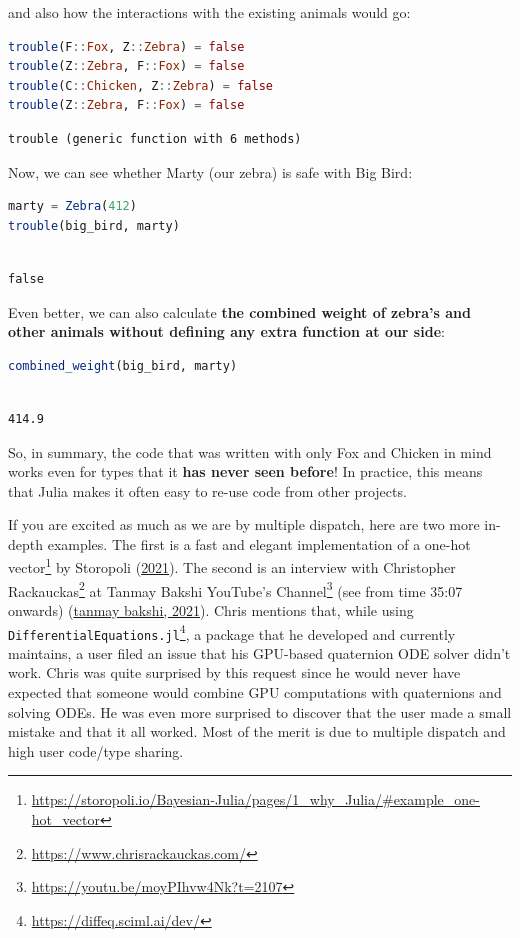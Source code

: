 \documentclass[
  notoc %
]{tufte-book}
\DeclareRobustCommand{\href}[2]{#2\footnote{\url{#1}}}
\newcommand{\passthrough}[1]{#1}
\begin{document}
and also how the interactions with the existing animals would go:

\begin{lstlisting}[language=Julia]
trouble(F::Fox, Z::Zebra) = false
trouble(Z::Zebra, F::Fox) = false
trouble(C::Chicken, Z::Zebra) = false
trouble(Z::Zebra, F::Fox) = false
\end{lstlisting}

\begin{lstlisting}[language=Output]
trouble (generic function with 6 methods)
\end{lstlisting}

Now, we can see whether Marty (our zebra) is safe with Big Bird:

\begin{lstlisting}[language=Julia]
marty = Zebra(412)
trouble(big_bird, marty)
\end{lstlisting}

\begin{lstlisting}[language=Output]

false

\end{lstlisting}

Even better, we can also calculate \textbf{the combined weight of
zebra's and other animals without defining any extra function at our
side}:

\begin{lstlisting}[language=Julia]
combined_weight(big_bird, marty)
\end{lstlisting}

\begin{lstlisting}[language=Output]

414.9

\end{lstlisting}

So, in summary, the code that was written with only Fox and Chicken in
mind works even for types that it \textbf{has never seen before}! In
practice, this means that Julia makes it often easy to re-use code from
other projects.

If you are excited as much as we are by multiple dispatch, here are two
more in-depth examples. The first is a
\href{https://storopoli.io/Bayesian-Julia/pages/1_why_Julia/\#example_one-hot_vector}{fast
and elegant implementation of a one-hot vector} by Storopoli
(\protect\hyperlink{ref-storopoli2021bayesianjulia}{2021}). The second
is an interview with \href{https://www.chrisrackauckas.com/}{Christopher
Rackauckas} at \href{https://youtu.be/moyPIhvw4Nk?t=2107}{Tanmay Bakshi
YouTube's Channel} (see from time 35:07 onwards)
(\protect\hyperlink{ref-tanmaybakshiBakingKnowledgeMachine2021}{tanmay
bakshi, 2021}). Chris mentions that, while using
\href{https://diffeq.sciml.ai/dev/}{\passthrough{\lstinline!DifferentialEquations.jl!}},
a package that he developed and currently maintains, a user filed an
issue that his GPU-based quaternion ODE solver didn't work. Chris was
quite surprised by this request since he would never have expected that
someone would combine GPU computations with quaternions and solving
ODEs. He was even more surprised to discover that the user made a small
mistake and that it all worked. Most of the merit is due to multiple
dispatch and high user code/type sharing.
\end{document}

